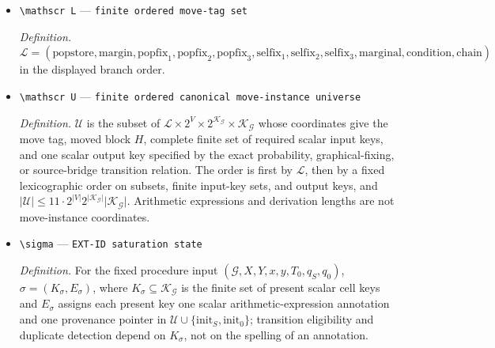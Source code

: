 \documentclass{article}
\begin{document}
\begin{itemize}
  \par\smallskip\noindent\emph{Definition.} \(\mathscr K_{\mathcal G}=\{(A,B,C,s,a,b,c):\varnothing\ne A\subseteq V,\ A,B,C\text{ pairwise disjoint},\ s\in\{\mathrm{pop},\mathrm{sel}\},\ a\in\mathcal X_A,\ b\in\mathcal X_B,\ c\in\mathcal X_C\}\). Thus \(\lvert\mathscr K_{\mathcal G}\rvert=2\sum_{A\ne\varnothing,\,A,B,C\,\mathrm{disjoint}}\lvert\mathcal X_A\rvert\lvert\mathcal X_B\rvert\lvert\mathcal X_C\rvert\le2\{(1+3r)^{\lvert V\rvert}-(1+2r)^{\lvert V\rvert}\}<2(1+3r)^{\lvert V\rvert}\).
  \item \texttt{\textbackslash{}\allowbreak{}mathscr L} --- \texttt{finite ordered move-\allowbreak{}tag set}
  \par\smallskip\noindent\emph{Definition.} \(\mathscr L=(\mathrm{popstore},\mathrm{margin},\mathrm{popfix}_1,\mathrm{popfix}_2,\mathrm{popfix}_3,\mathrm{selfix}_1,\mathrm{selfix}_2,\mathrm{selfix}_3,\mathrm{marginal},\mathrm{condition},\mathrm{chain})\) in the displayed branch order.
  \item \texttt{\textbackslash{}\allowbreak{}mathscr U} --- \texttt{finite ordered canonical move-\allowbreak{}instance universe}
  \par\smallskip\noindent\emph{Definition.} \(\mathscr U\) is the subset of \(\mathscr L\times2^V\times2^{\mathscr K_{\mathcal G}}\times\mathscr K_{\mathcal G}\) whose coordinates give the move tag, moved block \(H\), complete finite set of required scalar input keys, and one scalar output key specified by the exact probability, graphical-fixing, or source-bridge transition relation. The order is first by \(\mathscr L\), then by a fixed lexicographic order on subsets, finite input-key sets, and output keys, and \(\lvert\mathscr U\rvert\le11\cdot2^{\lvert V\rvert}2^{\lvert\mathscr K_{\mathcal G}\rvert}\lvert\mathscr K_{\mathcal G}\rvert\). Arithmetic expressions and derivation lengths are not move-instance coordinates.
  \item \texttt{\textbackslash{}\allowbreak{}sigma} --- \texttt{EXT-\allowbreak{}ID saturation state}
  \par\smallskip\noindent\emph{Definition.} For the fixed procedure input \((\mathcal G,X,Y,x,y,T_0,q_S,q_0)\), \(\sigma=(K_\sigma,E_\sigma)\), where \(K_\sigma\subseteq\mathscr K_{\mathcal G}\) is the finite set of present scalar cell keys and \(E_\sigma\) assigns each present key one scalar arithmetic-expression annotation and one provenance pointer in \(\mathscr U\cup\{\mathrm{init}_S,\mathrm{init}_0\}\); transition eligibility and duplicate detection depend on \(K_\sigma\), not on the spelling of an annotation.

\end{itemize}
\end{document}
